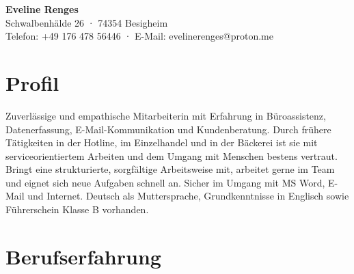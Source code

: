 \documentclass[12pt,a4paper]{article}
\begin{document}
\begin{center}
  {\LARGE \textbf{Eveline Renges}}\\
  Schwalbenhälde 26 · 74354 Besigheim\\
  Telefon: +49 176 478 56446 · E-Mail: evelinerenges@proton.me
\end{center}

\vspace{0.5em}

\section*{Profil}

Zuverlässige und empathische Mitarbeiterin mit Erfahrung in Büroassistenz, Datenerfassung, E-Mail-Kommunikation und Kundenberatung. Durch frühere Tätigkeiten in der Hotline, im Einzelhandel und in der Bäckerei ist sie mit serviceorientiertem Arbeiten und dem Umgang mit Menschen bestens vertraut. Bringt eine strukturierte, sorgfältige Arbeitsweise mit, arbeitet gerne im Team und eignet sich neue Aufgaben schnell an. Sicher im Umgang mit MS Word, E-Mail und Internet. Deutsch als Muttersprache, Grundkenntnisse in Englisch sowie Führerschein Klasse B vorhanden.
\section*{Berufserfahrung}
\end{document}

